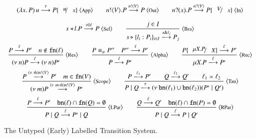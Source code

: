 \begin{figure}[t]
	\[
	\begin{array}{c}
		\appl{(\abs{x}{P})}{u} \by{\tau} P \subst{u}{x}\ \ltsrule{App}
		\qquad
		\bout{n}{V} P \by{\bactout{n}{V}} P\ \ltsrule{Out}
		\qquad
		\binp{n}{x} P \by{\bactinp{n}{V}} P\subst{V}{x}\ \ltsrule{In}
		\\[4mm]

		\bsel{s}{l}{P} \by{\bactsel{s}{l}} P\ \ltsrule{Sel}
		\qquad
		\tree{
			j \in I
		}
		{
			\bbra{s}{l_i:P_i}_{i \in I} \by{\bactbra{s}{l_j}} P_j
		}\ \ltsrule{Bra}
		\\[6mm]

		\tree{
			P \by{\ell} P' \quad n \notin \fn{\ell}
		}{
			\news{n} P \by{\ell} \news{n} P' 
		}\ \ltsrule{Res}
		\qquad
		\tree{
			P \scong_\alpha P'' \quad P'' \by{\ell} P'
		}{
			P \by{\ell} P'
		}\ \ltsrule{Alpha}
		\qquad
		\tree{
			P \subst{\recp{X}{P}}{\varp{X}} \by{\ell} P'%
		}{
			\recp{X}{P} \by{\ell} P'
		}\ \ltsrule{Rec}
		\\[6mm]


		\tree{
			P \by{\news{\tilde{m}} \bactout{n}{V}} P' \quad m \in \fn{V}
		}{
			\news{m} P \by{\news{m\cat\tilde{m}} \bactout{n}{V}} P'
		}\ \ltsrule{Scope}
		\qquad
		\tree{
			P \by{\ell_1} P' \qquad Q \by{\ell_2} Q' \qquad \ell_1 \asymp \ell_2
		}{
			P \Par Q \by{\tau} \newsp{\bn{\ell_1} \cup \bn{\ell_2}}{P' \Par Q'}
		}\ \ltsrule{Tau}
		\\[6mm]

		\tree{

			P \by{\ell} P' \quad \bn{\ell} \cap \fn{Q} = \es
		}{
			P \Par Q \by{\ell} P' \Par Q
		}\ \ltsrule{LPar}
		\qquad
		\tree{
			Q \by{\ell} Q' \quad \bn{\ell} \cap \fn{P} = \es
		}{
			P \Par Q \by{\ell} P \Par Q'
		}\ \ltsrule{RPar}
	\end{array}
	\]
	\caption{The Untyped (Early) Labelled Transition System. \label{fig:untyped_LTS}}
\end{figure}
